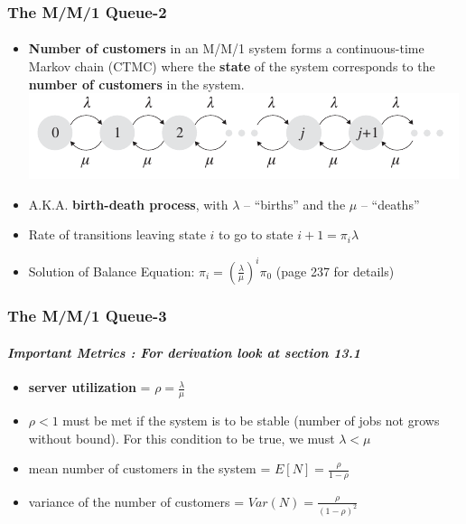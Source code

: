 \documentclass{beamer}
\begin{document}
\begin{frame} 
\frametitle{The M/M/1 Queue-2 }
\framesubtitle{\textbf{\textit{}}}
\begin{itemize}
\item  \textbf{Number of customers} in an M/M/1 system forms a continuous-time Markov chain
(CTMC) where the \textbf{state} of the system corresponds to the \textbf{number of customers} in the
system.
\includegraphics[scale=.7]{images/mm1CTMC.jpeg}
\item A.K.A. \textbf{birth-death process}, with $\lambda$ -- ``births'' and the $\mu$ -- ``deaths''
\item Rate of transitions leaving state $i$ to go to state $i+1 = \pi_i\lambda$ 
\item Solution of Balance Equation: $\pi_i = (\frac{\lambda}{\mu})^i \pi_0$ (page 237 for details)
\end{itemize}

\end{frame}

\begin{frame} 
\frametitle{The M/M/1 Queue-3 }
\framesubtitle{\textbf{\textit{Important Metrics : For derivation look at section 13.1}}}
\begin{itemize}
\item  \textbf{ server utilization} = $\rho = \frac{\lambda}{\mu} $
\item  $\rho < 1$  must be met if the system is to be stable (number of jobs not grows without bound). For this
condition to be true, we must ${\lambda}<{\mu}$
\item mean number of customers in the system = $E[N] = \frac{\rho}{1-\rho}$
\item variance of the number of customers = $Var(N) = \frac{\rho}{{(1-\rho)}^2}$

\end{itemize}

\end{frame}
\end{document}
